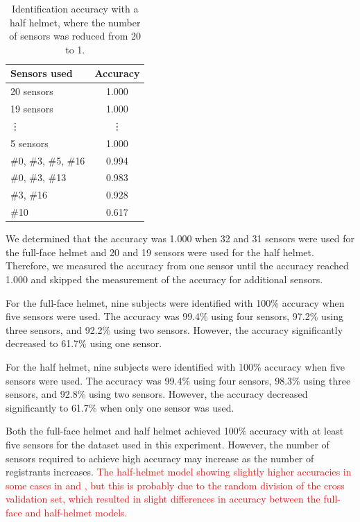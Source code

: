 \documentclass[english,preprint,JIP]{ipsj}
\begin{document}
\begin{table}[!t]
 \centering
  \caption{Identification accuracy with a half helmet, where the number of sensors was reduced from 20 to 1.}
    \label{tab:half_num}
  \begin{tabular}{l|c} \hline\hline
    Sensors used & Accuracy \\ \hline
    20 sensors & 1.000 \\
    19 sensors & 1.000 \\
    \vdots & \vdots \\
    5 sensors & 1.000 \\
    $\#$0, $\#$3, $\#$5, $\#$16 & 0.994 \\
    $\#$0, $\#$3, $\#$13        & 0.983 \\
    $\#$3, $\#$16               & 0.928 \\
    $\#$10                      & 0.617 \\ \hline
  \end{tabular}
\end{table}

We determined that the accuracy was 1.000 when 32 and 31 sensors were used for the full-face helmet and 20 and 19 sensors were used for the half helmet. Therefore, we measured the accuracy from one sensor until the accuracy reached 1.000 and skipped the measurement of the accuracy for additional sensors.\par

For the full-face helmet, nine subjects were identified with 100\% accuracy when five sensors were used. The accuracy was 99.4\% using four sensors, 97.2\% using three sensors, and 92.2\% using two sensors. However, the accuracy significantly decreased to 61.7\% using one sensor.\par

For the half helmet, nine subjects were identified with 100\% accuracy when five sensors were used. The accuracy was 99.4\% using four sensors, 98.3\% using three sensors, and 92.8\% using two sensors. However, the accuracy decreased significantly to 61.7\% when only one sensor was used.\par

Both the full-face helmet and half helmet achieved 100\% accuracy with at least five sensors for the dataset used in this experiment. However, the number of sensors required to achieve high accuracy may increase as the number of registrants increases. \textcolor{red}{The half-helmet model showing slightly higher accuracies in some cases in  and , but this is probably due to the random division of the cross validation set, which resulted in slight differences in accuracy between the full-face and half-helmet models.}\par
\end{document}
